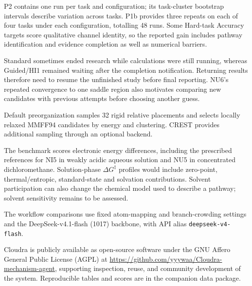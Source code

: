 P2 contains one run per task and configuration; its task-cluster bootstrap intervals describe variation across tasks. P1b provides three repeats on each of four tasks under each configuration, totalling 48 runs. Some Hard-task Accuracy targets score qualitative channel identity, so the reported gain includes pathway identification and evidence completion as well as numerical barriers.

Standard sometimes ended research while calculations were still running, whereas Guided/HI1 remained waiting after the completion notification. Returning results therefore need to resume the unfinished study before final reporting. NU6's repeated convergence to one saddle region also motivates comparing new candidates with previous attempts before choosing another guess.

Default preorganization samples 32 rigid relative placements and selects locally relaxed MMFF94 candidates by energy and clustering. CREST provides additional sampling through an optional backend.

The benchmark scores electronic energy differences, including the prescribed references for NI5 in weakly acidic aqueous solution and NU5 in concentrated dichloromethane. Solution-phase $\Delta G^\ddagger$ profiles would include zero-point, thermal/entropic, standard-state and solvation contributions. Solvent participation can also change the chemical model used to describe a pathway; solvent sensitivity remains to be assessed.

The workflow comparisons use fixed atom-mapping and branch-crowding settings and the DeepSeek-v4.1-flash (1017) backbone, with API alias \texttt{deepseek-v4-flash}.

Cloudra is publicly available as open-source software under the GNU Affero General Public License (AGPL) at \url{https://github.com/yyywaa/Cloudra-mechanism-agent}, supporting inspection, reuse, and community development of the system. Reproducible tables and scores are in the companion data package.
